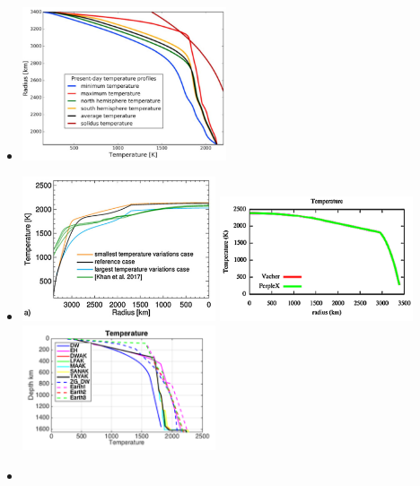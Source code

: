 \begin{itemize}
\item {}

\begin{center}
\includegraphics[width=6cm]{images/mars/temperature/plpt18}
\end{center}

\item {}

\begin{center}
\includegraphics[width=5.7cm]{images/mars/temperature/smls19c}
\includegraphics[width=5.7cm]{images/mars/temperature/smls19e}
\includegraphics[width=5.7cm]{images/mars/temperature/smls19f}
\end{center}

\item {}


\end{itemize}

